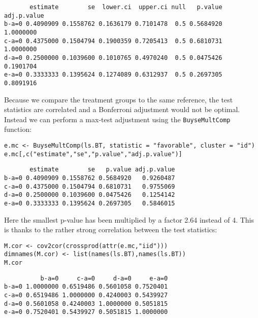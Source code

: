 \documentclass[12pt]{article}
\begin{document}
\begin{verbatim}
       estimate        se  lower.ci  upper.ci null   p.value adj.p.value
b-a=0 0.4090909 0.1558762 0.1636179 0.7101478  0.5 0.5684920   1.0000000
c-a=0 0.4375000 0.1504794 0.1900359 0.7205413  0.5 0.6810731   1.0000000
d-a=0 0.2500000 0.1039600 0.1010765 0.4970240  0.5 0.0475426   0.1901704
e-a=0 0.3333333 0.1395624 0.1274089 0.6312937  0.5 0.2697305   0.8091916
\end{verbatim}



Because we compare the treatment groups to the same reference, the
test statistics are correlated and a Bonferroni adjustment would not
be optimal. Instead we can perform a max-test adjustment using the
\texttt{BuyseMultComp} function:
\lstset{language=r,label= ,caption= ,captionpos=b,numbers=none}
\begin{lstlisting}
e.mc <- BuyseMultComp(ls.BT, statistic = "favorable", cluster = "id")
e.mc[,c("estimate","se","p.value","adj.p.value")]
\end{lstlisting}

\begin{verbatim}
       estimate        se   p.value adj.p.value
b-a=0 0.4090909 0.1558762 0.5684920   0.9260487
c-a=0 0.4375000 0.1504794 0.6810731   0.9755069
d-a=0 0.2500000 0.1039600 0.0475426   0.1254142
e-a=0 0.3333333 0.1395624 0.2697305   0.5846015
\end{verbatim}


Here the smallest p-value has been multiplied by a factor 2.64 instead
of 4. This is thanks to the rather strong correlation between the test
statistics:
\lstset{language=r,label= ,caption= ,captionpos=b,numbers=none}
\begin{lstlisting}
M.cor <- cov2cor(crossprod(attr(e.mc,"iid")))
dimnames(M.cor) <- list(names(ls.BT),names(ls.BT))
M.cor
\end{lstlisting}

\begin{verbatim}
          b-a=0     c-a=0     d-a=0     e-a=0
b-a=0 1.0000000 0.6519486 0.5601058 0.7520401
c-a=0 0.6519486 1.0000000 0.4240003 0.5439927
d-a=0 0.5601058 0.4240003 1.0000000 0.5051815
e-a=0 0.7520401 0.5439927 0.5051815 1.0000000
\end{verbatim}
\end{document}
